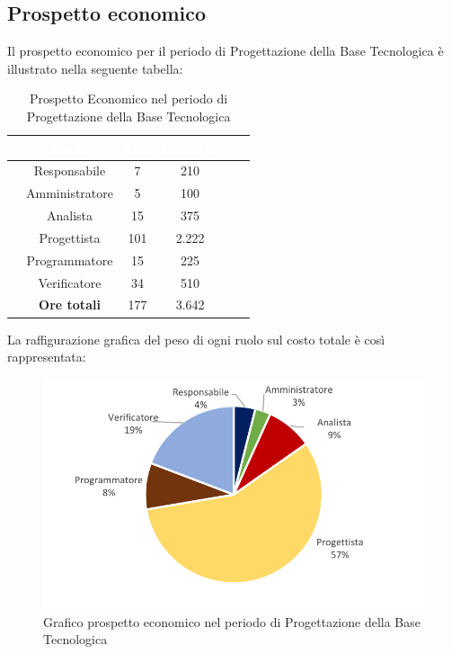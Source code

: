 \subsection{Prospetto economico}
Il prospetto economico per il periodo di Progettazione della Base Tecnologica è illustrato nella seguente tabella:

\begin{table}[ht]
	\begin{center}
		\begin{tabular}{cccccc}
			\rowcolor{coolblack}
			\hline
			&\textcolor{white}{Ruolo}&	\textcolor{white}{Ore} &\textcolor{white}{Costo(\euro)} \\
			\hline
			&Responsabile           &7&210 \\
			&Amministratore        & 5& 100 \\
			&Analista                   & 15& 375 \\
			&Progettista              &  101& 2.222\\
			&Programmatore       & 15& 225 \\
			&Verificatore             & 34& 510 \\
			\hline
			&\textbf{Ore totali}    &177&3.642\\
		\end{tabular}
		\caption{Prospetto Economico nel periodo di Progettazione della Base Tecnologica}
	\end{center}
\end{table}


La raffigurazione grafica del peso di ogni ruolo sul costo totale è così rappresentata:
\begin{figure}[!ht]
	\begin{center}
		\includegraphics[scale=0.90]{images/grafoProgettazioneTecnologicaEuro.png}
		\caption{Grafico prospetto economico nel periodo di Progettazione della Base Tecnologica}
	\end{center}
\end{figure}
\newpage
